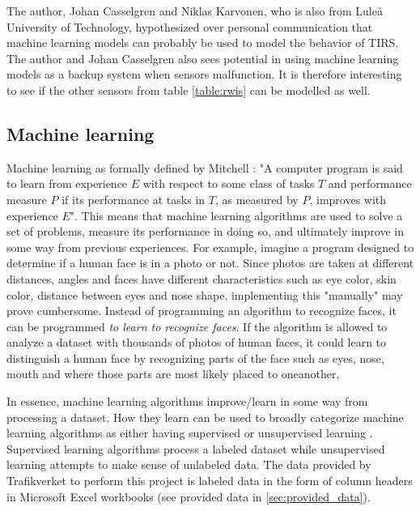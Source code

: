 	The author, Johan Casselgren and Niklas Karvonen, who is also from Luleå University of Technology, hypothesized over personal communication that machine learning models can probably be used to model the behavior of TIRS. The author and Johan Casselgren also sees potential in using machine learning models as a backup system when sensors malfunction. It is therefore interesting to see if the other sensors from table \ref{table:rwis} can be modelled as well. 



	\subsection{Machine learning} \label{sec:machinelearning}
	Machine learning as formally defined by Mitchell \cite{BOOK:2}: 
"A computer program is said to learn from experience $E$ with respect to some class of tasks $T$ and performance measure $P$ if its performance at tasks in $T$, as measured by $P$, improves with experience $E$". This means that machine learning algorithms are used to solve a set of problems, measure its performance in doing so, and ultimately improve in some way from previous experiences. For example, imagine a program designed to determine if a human face is in a photo or not. Since photos are taken at different distances, angles and faces have different characteristics such as eye color, skin color, distance between eyes and nose shape, implementing this "manually" may prove cumbersome. Instead of programming an algorithm to recognize faces, it can be programmed  \emph{to learn to recognize faces}. If the algorithm is allowed to analyze a dataset with thousands of photos of human faces, it could learn to distinguish a human face by recognizing parts of the face such as eyes, nose, mouth and where those parts are most likely placed to oneanother.

	In essence, machine learning algorithms improve/learn in some way from processing a dataset. How they learn can be used to broadly categorize machine learning algorithms as either having supervised or unsupervised learning \cite{BOOK:1}. Supervised learning algorithms process a labeled dataset while unsupervised learning attempts to make sense of unlabeled data. The data provided by Trafikverket to perform this project is labeled data in the form of column headers in Microsoft Excel workbooks (see provided data in \ref{sec:provided_data}). 

